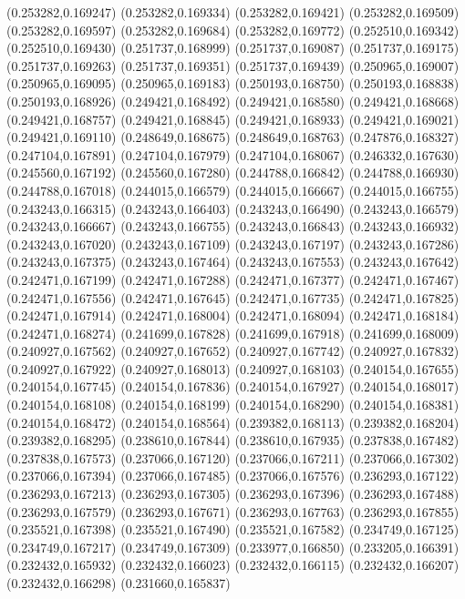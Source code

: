 (0.253282,0.169247)
(0.253282,0.169334)
(0.253282,0.169421)
(0.253282,0.169509)
(0.253282,0.169597)
(0.253282,0.169684)
(0.253282,0.169772)
(0.252510,0.169342)
(0.252510,0.169430)
(0.251737,0.168999)
(0.251737,0.169087)
(0.251737,0.169175)
(0.251737,0.169263)
(0.251737,0.169351)
(0.251737,0.169439)
(0.250965,0.169007)
(0.250965,0.169095)
(0.250965,0.169183)
(0.250193,0.168750)
(0.250193,0.168838)
(0.250193,0.168926)
(0.249421,0.168492)
(0.249421,0.168580)
(0.249421,0.168668)
(0.249421,0.168757)
(0.249421,0.168845)
(0.249421,0.168933)
(0.249421,0.169021)
(0.249421,0.169110)
(0.248649,0.168675)
(0.248649,0.168763)
(0.247876,0.168327)
(0.247104,0.167891)
(0.247104,0.167979)
(0.247104,0.168067)
(0.246332,0.167630)
(0.245560,0.167192)
(0.245560,0.167280)
(0.244788,0.166842)
(0.244788,0.166930)
(0.244788,0.167018)
(0.244015,0.166579)
(0.244015,0.166667)
(0.244015,0.166755)
(0.243243,0.166315)
(0.243243,0.166403)
(0.243243,0.166490)
(0.243243,0.166579)
(0.243243,0.166667)
(0.243243,0.166755)
(0.243243,0.166843)
(0.243243,0.166932)
(0.243243,0.167020)
(0.243243,0.167109)
(0.243243,0.167197)
(0.243243,0.167286)
(0.243243,0.167375)
(0.243243,0.167464)
(0.243243,0.167553)
(0.243243,0.167642)
(0.242471,0.167199)
(0.242471,0.167288)
(0.242471,0.167377)
(0.242471,0.167467)
(0.242471,0.167556)
(0.242471,0.167645)
(0.242471,0.167735)
(0.242471,0.167825)
(0.242471,0.167914)
(0.242471,0.168004)
(0.242471,0.168094)
(0.242471,0.168184)
(0.242471,0.168274)
(0.241699,0.167828)
(0.241699,0.167918)
(0.241699,0.168009)
(0.240927,0.167562)
(0.240927,0.167652)
(0.240927,0.167742)
(0.240927,0.167832)
(0.240927,0.167922)
(0.240927,0.168013)
(0.240927,0.168103)
(0.240154,0.167655)
(0.240154,0.167745)
(0.240154,0.167836)
(0.240154,0.167927)
(0.240154,0.168017)
(0.240154,0.168108)
(0.240154,0.168199)
(0.240154,0.168290)
(0.240154,0.168381)
(0.240154,0.168472)
(0.240154,0.168564)
(0.239382,0.168113)
(0.239382,0.168204)
(0.239382,0.168295)
(0.238610,0.167844)
(0.238610,0.167935)
(0.237838,0.167482)
(0.237838,0.167573)
(0.237066,0.167120)
(0.237066,0.167211)
(0.237066,0.167302)
(0.237066,0.167394)
(0.237066,0.167485)
(0.237066,0.167576)
(0.236293,0.167122)
(0.236293,0.167213)
(0.236293,0.167305)
(0.236293,0.167396)
(0.236293,0.167488)
(0.236293,0.167579)
(0.236293,0.167671)
(0.236293,0.167763)
(0.236293,0.167855)
(0.235521,0.167398)
(0.235521,0.167490)
(0.235521,0.167582)
(0.234749,0.167125)
(0.234749,0.167217)
(0.234749,0.167309)
(0.233977,0.166850)
(0.233205,0.166391)
(0.232432,0.165932)
(0.232432,0.166023)
(0.232432,0.166115)
(0.232432,0.166207)
(0.232432,0.166298)
(0.231660,0.165837)

